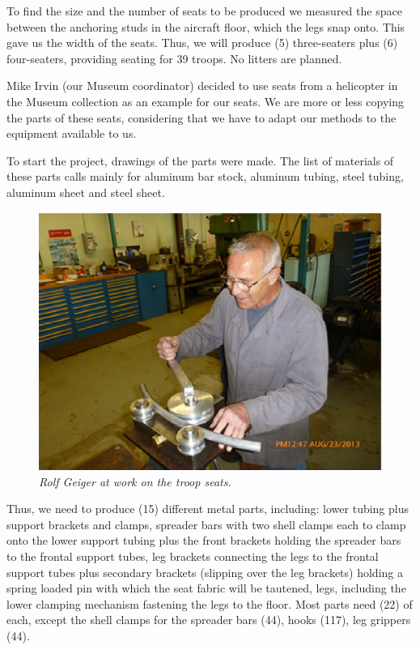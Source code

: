 \begin{multicols}{2}

To find the size and the number of seats to be produced we measured
the space between the anchoring studs in the aircraft floor, which the
legs snap onto. This gave us the width of the seats. Thus, we will
produce (5) three-seaters plus (6) four-seaters, providing seating for
39 troops. No litters are planned.

Mike Irvin (our Museum coordinator) decided to use seats from a
helicopter in the Museum collection as an example for our seats. We
are more or less copying the parts of these seats, considering that we
have to adapt our methods to the equipment available to us. 

To start the project, drawings of the parts were made. The list of
materials of these parts calls mainly for aluminum bar stock, aluminum
tubing, steel tubing, aluminum sheet and steel sheet. 

\begin{figure}[htbp]
   \vspace{2em}
   \centering
   \includegraphics[scale=0.5]{rolf.eps}
   \caption*{\small \em Rolf Geiger at work on the troop seats.}
   \label{fig:rolf}
\end{figure}

Thus, we need to produce (15) different metal parts, including: lower
tubing plus support brackets and clamps, spreader bars with two shell
clamps each to clamp onto the lower support tubing plus the front
brackets holding the spreader bars to the frontal support tubes, leg
brackets connecting the legs to the frontal support tubes plus
secondary brackets (slipping over the leg brackets) holding a spring
loaded pin with which the seat fabric will be tautened, legs,
including the lower clamping mechanism fastening the legs to the
floor. Most parts need (22) of each, except the shell clamps for the
spreader bars (44), hooks (117), leg grippers (44).
  

\end{multicols}
